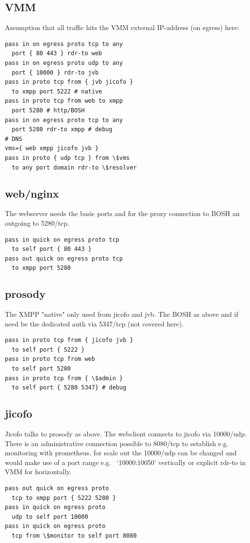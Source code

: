 \documentclass[conference]{IEEEtran}
\begin{document}
\subsection{VMM}
Assumption that all traffic hits the VMM external IP-address (on egress) here:
\begin{verbatim}
pass in on egress proto tcp to any 
  port { 80 443 } rdr-to web
pass in on egress proto udp to any 
  port { 10000 } rdr-to jvb
pass in proto tcp from { jvb jicofo } 
  to xmpp port 5222 # native
pass in proto tcp from web to xmpp 
  port 5280 # http/BOSH
pass in on egress proto tcp to any 
  port 5280 rdr-to xmpp # debug
# DNS
vms={ web xmpp jicofo jvb }
pass in proto { udp tcp } from \$vms 
  to any port domain rdr-to \$resolver
\end{verbatim}
\subsection{web/nginx}
The webserver needs the basic ports and for the proxy connection to BOSH an outgoing to 5280/tcp.
\begin{verbatim}
pass in quick on egress proto tcp
  to self port { 80 443 }
pass out quick on egress proto tcp
  to xmpp port 5280
\end{verbatim}
\subsection{prosody}
The XMPP "native" only used from jicofo and jvb. The BOSH as above and if need be
the dedicated auth via 5347/tcp (not covered here).
\begin{verbatim}
pass in proto tcp from { jicofo jvb }
  to self port { 5222 }
pass in proto tcp from web
  to self port 5280
pass in proto tcp from { \$admin }
  to self port { 5280 5347} # debug
\end{verbatim}
\subsection{jicofo}
Jicofo talks to prosody as above. The webclient connects to jicofo via 10000/udp. There
is an administrative connection possible to 8080/tcp to establish e.g. monitoring with prometheus.
for scale out the 10000/udp can be changed and would make use of a port range e.g. 
‘10000:10050’ vertically or explicit rdr-to in VMM for horizontally.

\begin{verbatim}
pass out quick on egress proto 
  tcp to xmpp port { 5222 5280 }
pass in quick on egress proto 
  udp to self port 10000
pass in quick on egress proto 
  tcp from \$monitor to self port 8080
\end{verbatim}
\end{document}
